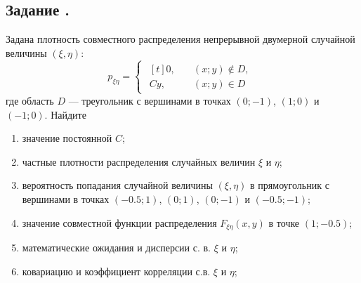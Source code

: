 \documentclass[12pt]{article}
\begin{document}
\subsection{Задание .}
Задана плотность совместного распределения непрерывной двумерной случайной величины $(\xi, \eta)$:
\begin{equation*}
	p_{\xi\eta} =
	\begin{cases}
		\begin{aligned}[t]
			0,  & \quad (x;y) \notin D, \\
			Cy, & \quad (x;y) \in D
		\end{aligned}
	\end{cases}
\end{equation*}
где область $D$ --- треугольник с вершинами в точках $(0;-1)$, $(1;0)$ и $(-1;0)$.
Найдите
\begin{enumerate}
	\item значение постоянной $C$;
	\item частные плотности распределения случайных величин $\xi$ и $\eta$;
	\item вероятность попадания случайной величины $(\xi, \eta)$ в прямоугольник с вершинами в точках $(-0.5;1)$, $(0;1)$, $(0;-1)$ и $(-0.5;-1)$;
	\item значение совместной функции распределения $F_{\xi\eta}(x,y)$ в точке $(1;-0.5)$;
	\item математические ожидания и дисперсии с. в. $\xi$ и $\eta$;
	\item ковариацию и коэффициент корреляции с.в. $\xi$ и $\eta$;
\end{enumerate}
\end{document}
